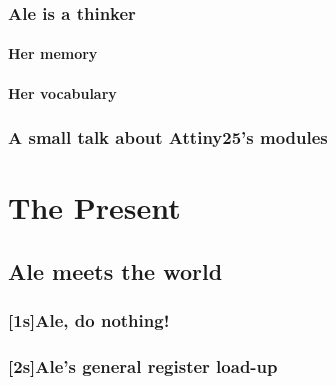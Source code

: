 \documentclass[12pt, a4paper]{book}
\begin{document}
\section{Ale is a thinker}
\subsection{Her memory}
\subsection{Her vocabulary}
\section{A small talk about Attiny25's modules}

\part[The Present]{The Present\\[2ex]
}

\chapter{Ale meets the world}
\section{[1s]Ale, do nothing!}
\section{[2s]Ale's general register load-up}
\end{document}
